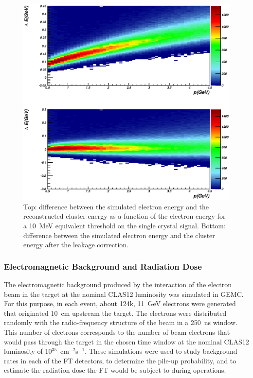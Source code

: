 \begin{figure}
\includegraphics[height=\columnwidth]{fig/gemc_leakage.eps}
\caption{Top: difference between the simulated electron energy and the reconstructed cluster energy as a function
  of the electron energy for a 10~MeV equivalent threshold on the single crystal signal. Bottom: difference between
  the simulated electron energy and the cluster energy after the leakage correction.}
\label{fig:gemc_leakage}
\end{figure}

\subsubsection{Electromagnetic Background and Radiation Dose}

The electromagnetic background produced by the interaction of the electron beam in the target  at the nominal
CLAS12 luminosity was simulated in GEMC. For this purpose, in each event, about 124k, 11~GeV electrons were
generated that originated 10~cm upstream the target. The electrons were distributed randomly with the
radio-frequency structure of the beam in a 250~ns window. This number of electrons corresponds to the number
of beam electrons that would pass through the target in the chosen time window at the nominal CLAS12 luminosity
of 10$^{35}$~cm$^{-2}$s$^{-1}$. These simulations were used to study background rates in each of the FT detectors,
to determine the pile-up probability, and to estimate the radiation dose the FT would be subject to during operations.

